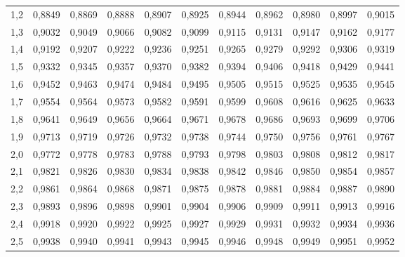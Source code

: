 \begin{tabular}{c | c c c c c c c c c c}
    1,2     & 0,8849        & 0,8869        & 0,8888        & 0,8907        & 0,8925        & 0,8944& 0,8962 & 0,8980        & 0,8997        & 0,9015 \\
    1,3     & 0,9032        & 0,9049        & 0,9066        & 0,9082        & 0,9099        & 0,9115& 0,9131 & 0,9147        & 0,9162        & 0,9177 \\
    1,4     & 0,9192        & 0,9207        & 0,9222        & 0,9236        & 0,9251        & 0,9265& 0,9279 & 0,9292        & 0,9306        & 0,9319 \\
    1,5     & 0,9332        & 0,9345        & 0,9357        & 0,9370        & 0,9382        & 0,9394& 0,9406 & 0,9418        & 0,9429        & 0,9441 \\
    1,6     & 0,9452        & 0,9463        & 0,9474        & 0,9484        & 0,9495        & 0,9505& 0,9515 & 0,9525        & 0,9535        & 0,9545 \\
    1,7     & 0,9554        & 0,9564        & 0,9573        & 0,9582        & 0,9591        & 0,9599& 0,9608 & 0,9616        & 0,9625        & 0,9633 \\
    1,8     & 0,9641        & 0,9649        & 0,9656        & 0,9664        & 0,9671        & 0,9678& 0,9686 & 0,9693        & 0,9699        & 0,9706 \\
    1,9     & 0,9713        & 0,9719        & 0,9726        & 0,9732        & 0,9738        & 0,9744& 0,9750 & 0,9756        & 0,9761        & 0,9767 \\
    2,0     & 0,9772        & 0,9778        & 0,9783        & 0,9788        & 0,9793        & 0,9798& 0,9803 & 0,9808        & 0,9812        & 0,9817 \\
    2,1     & 0,9821        & 0,9826        & 0,9830        & 0,9834        & 0,9838        & 0,9842& 0,9846 & 0,9850        & 0,9854        & 0,9857 \\
    2,2     & 0,9861        & 0,9864        & 0,9868        & 0,9871        & 0,9875        & 0,9878& 0,9881 & 0,9884        & 0,9887        & 0,9890 \\
    2,3     & 0,9893        & 0,9896        & 0,9898        & 0,9901        & 0,9904        & 0,9906& 0,9909 & 0,9911        & 0,9913        & 0,9916 \\
    2,4     & 0,9918        & 0,9920        & 0,9922        & 0,9925        & 0,9927        & 0,9929& 0,9931 & 0,9932        & 0,9934        & 0,9936 \\
    2,5     & 0,9938        & 0,9940        & 0,9941        & 0,9943        & 0,9945        & 0,9946& 0,9948 & 0,9949        & 0,9951        & 0,9952 \\

\end{tabular}
